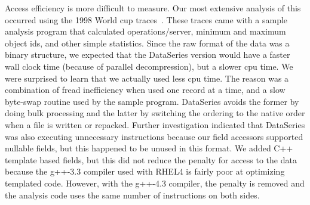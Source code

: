 \documentclass{acm_proc_article-sp}
\begin{document}
Access efficiency 
is more difficult to measure.  Our most
extensive analysis of this occurred using the 1998 World cup
traces~\cite{ita-wcweb98}.  These traces came with a sample analysis
program that calculated operations/server, minimum and maximum object
ids, and other simple statistics.  Since the raw format of the data
was a binary structure, we expected that the DataSeries version would
have a faster wall clock time (because of parallel decompression), but
a slower cpu time.  We were surprised to learn that we actually used
less cpu time.  The reason 
was a combination of fread
inefficiency when used one record at a time, and a slow byte-swap
routine used by the sample program.  DataSeries avoids the former by
doing bulk processing and the latter by switching the ordering to the
native order when a file is written or repacked.  Further
investigation indicated that DataSeries was also executing unnecessary
instructions because our field accessors supported nullable fields,
but this happened to be unused in this format.  We added C++ template
based fields, but this did not reduce the penalty for access to the
data because the g++-3.3 compiler used with RHEL4 is fairly poor at
optimizing templated code.  However, with the g++-4.3 compiler, the
penalty is removed and the analysis code uses the same number of 
instructions on both sides.
\end{document}
